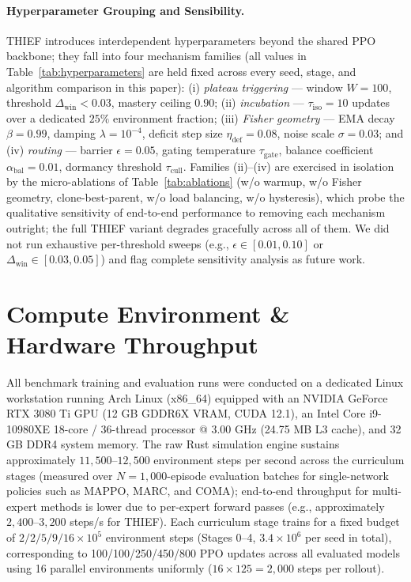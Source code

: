 

\paragraph{Hyperparameter Grouping and Sensibility.}
THIEF introduces interdependent hyperparameters beyond the shared PPO backbone; they fall into four mechanism families (all values in Table~\ref{tab:hyperparameters} are held fixed across every seed, stage, and algorithm comparison in this paper): (i) \emph{plateau triggering} --- window $W=100$, threshold $\Delta_{\text{win}}<0.03$, mastery ceiling $0.90$; (ii) \emph{incubation} --- $\tau_{\text{iso}}=10$ updates over a dedicated $25\%$ environment fraction; (iii) \emph{Fisher geometry} --- EMA decay $\beta=0.99$, damping $\lambda=10^{-4}$, deficit step size $\eta_{\text{def}}=0.08$, noise scale $\sigma=0.03$; and (iv) \emph{routing} --- barrier $\epsilon=0.05$, gating temperature $\tau_{\text{gate}}$, balance coefficient $\alpha_{\text{bal}}=0.01$, dormancy threshold $\tau_{\text{cull}}$. Families (ii)--(iv) are exercised in isolation by the micro-ablations of Table~\ref{tab:ablations} (w/o warmup, w/o Fisher geometry, clone-best-parent, w/o load balancing, w/o hysteresis), which probe the qualitative sensitivity of end-to-end performance to removing each mechanism outright; the full THIEF variant degrades gracefully across all of them. We did not run exhaustive per-threshold sweeps (e.g., $\epsilon \in [0.01, 0.10]$ or $\Delta_{\text{win}} \in [0.03, 0.05]$) and flag complete sensitivity analysis as future work.

\section{Compute Environment \& Hardware Throughput}
\label{sec:app_compute}
All benchmark training and evaluation runs were conducted on a dedicated Linux workstation running Arch Linux (x86\_64) equipped with an NVIDIA GeForce RTX 3080 Ti GPU (12 GB GDDR6X VRAM, CUDA 12.1), an Intel Core i9-10980XE 18-core / 36-thread processor @ 3.00 GHz (24.75 MB L3 cache), and 32 GB DDR4 system memory. The raw Rust simulation engine sustains approximately $11,\!500$--$12,\!500$ environment steps per second across the curriculum stages (measured over $N=1,\!000$-episode evaluation batches for single-network policies such as MAPPO, MARC, and COMA); end-to-end throughput for multi-expert methods is lower due to per-expert forward passes (e.g., approximately $2,\!400$--$3,\!200$ steps/s for THIEF). Each curriculum stage trains for a fixed budget of $2/2/5/9/16 \times 10^{5}$ environment steps (Stages 0--4, $3.4 \times 10^6$ per seed in total), corresponding to 100/100/250/450/800 PPO updates across all evaluated models using 16 parallel environments uniformly ($16 \times 125 = 2,\!000$ steps per rollout).
